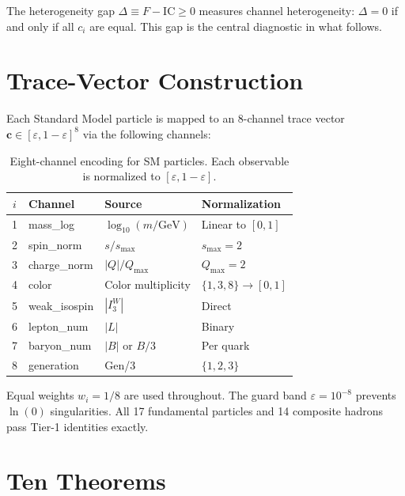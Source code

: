 \documentclass[
  aps,
  prd,
  twocolumn,
  superscriptaddress,
  nofootinbib,
  floatfix
]{revtex4-2}
\newcommand{\eps}{\varepsilon}
\newcommand{\tvec}{\mathbf{c}}
\newcommand{\IC}{\mathrm{IC}}
\begin{document}
The heterogeneity gap $\Delta \equiv F - \IC \geq 0$ measures channel
heterogeneity: $\Delta = 0$ if and only if all $c_i$ are equal.
This gap is the central diagnostic in what follows.

\section{Trace-Vector Construction}\label{sec:trace}

Each Standard Model particle is mapped to an 8-channel trace
vector $\tvec \in [\eps, 1{-}\eps]^8$ via the following channels:

\begin{table}[h]
\caption{\label{tab:channels}Eight-channel encoding for SM particles.
Each observable is normalized to $[\eps, 1{-}\eps]$.}
\begin{ruledtabular}
\begin{tabular}{clll}
$i$ & Channel & Source & Normalization \\
\hline
1 & mass\_log & $\log_{10}(m/\text{GeV})$ & Linear to $[0,1]$ \\
2 & spin\_norm & $s/s_{\max}$ & $s_{\max} = 2$ \\
3 & charge\_norm & $|Q|/Q_{\max}$ & $Q_{\max} = 2$ \\
4 & color & Color multiplicity & $\{1, 3, 8\} \to [0,1]$ \\
5 & weak\_isospin & $|I_3^W|$ & Direct \\
6 & lepton\_num & $|L|$ & Binary \\
7 & baryon\_num & $|B|$ or $B/3$ & Per quark \\
8 & generation & Gen/$3$ & $\{1,2,3\}$ \\
\end{tabular}
\end{ruledtabular}
\end{table}

Equal weights $w_i = 1/8$ are used throughout.  The guard band
$\eps = 10^{-8}$ prevents $\ln(0)$ singularities.  All 17
fundamental particles and 14 composite hadrons pass Tier-1
identities exactly.

\section{Ten Theorems}\label{sec:theorems}
\end{document}
